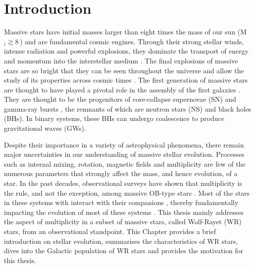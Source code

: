 \chapter{Introduction}\label{ch:introduction}


Massive stars have initial masses larger than eight times the mass of our sun (M$_i \gtrsim 8$\,\Msun{}) and are fundamental cosmic engines. Through their strong stellar winds, intense radiation and powerful explosions, they dominate the transport of energy and momentum into the interstellar medium \citep[c.f.][]{mac_low_distribution_2005}. The final explosions of massive stars are so bright that they can be seen throughout the universe and allow the study of its properties across cosmic times \citep{tanvir_-ray_2009}. The first generation of massive stars are thought to have played a pivotal role in the assembly of the first galaxies \citep{bromm_first_2004,robertson_early_2010}. They are thought to be the progenitors of core-collapse supernovae (SN) and gamma-ray bursts \citep{woosley_supernova_2006}, the remnants of which are neutron stars (NS) and black holes (BHs). In binary systems, these BHs can undergo coalescence to produce gravitational waves (GWs).

Despite their importance in a variety of astrophysical phenomena, there remain major uncertainties in our understanding of massive stellar evolution. Processes such as internal mixing, rotation, magnetic fields and multiplicity are few of the numerous parameters that strongly affect the mass, and hence evolution, of a star. In the past decades, observational surveys have shown that multiplicity is the rule, and not the exception, among massive OB-type stars \citep{mason_iccd_1998,mason_high_2009,sana_binary_2012,sana_vlt-flames_2013,sana_southern_2014,kobulnicky_toward_2014,barba_own_2014,dunstall_vlt-flames_2015,maiz_apellaniz_galactic_2016,maiz_apellaniz_monos_2019,almeida_tarantula_2017,banyard_observed_2022,villasenor_b-type_2021}. Most of the stars in these systems with interact with their companions \citep{fryer_constraints_2007,sana_binary_2012,sana_vlt-flames_2013,dunstall_vlt-flames_2015}, thereby fundamentally impacting the evolution of most of these systems \citep{paczynski_evolution_1967,pols_case_1994,1998Vanbeveren_popsynth,2014deMink_mergers}. This thesis mainly addresses the aspect of multiplicity in a subset of massive stars, called Wolf-Rayet (WR) stars, from an observational standpoint. This Chapter provides a brief introduction on stellar evolution, summarises the characteristics of WR stars, dives into the Galactic population of WR stars and provides the motivation for this thesis.

